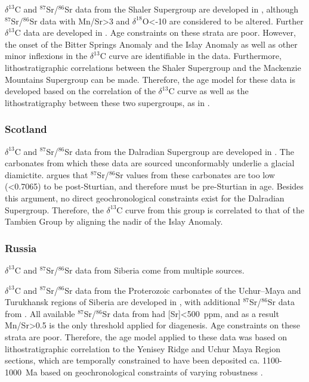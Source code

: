 \documentclass[11pt,letterpaper]{article}
\newcommand{\dC}{$\delta^{13}$C\xspace}
\newcommand{\dO}{$\delta^{18}$O\xspace}
\newcommand{\SrSr}{$^{87}$Sr/$^{86}$Sr\xspace}
\newcommand{\permil}{\textperthousand\xspace}
\begin{document}
\dC and \SrSr data from the Shaler Supergroup are developed in \citet{Asmerom1991a}, although \SrSr data with Mn/Sr\textgreater3 and \dO\textless-10\permil are considered to be altered. Further \dC data are developed in \citet{Jones2010a}. Age constraints on these strata are poor. However, the onset of the Bitter Springs Anomaly and the Islay Anomaly as well as other minor inflexions in the \dC curve are identifiable in the data. Furthermore, lithostratigraphic correlations between the Shaler Supergroup and the Mackenzie Mountains Supergroup can be made. Therefore, the age model for these data is developed based on the correlation of the \dC curve as well as the lithostratigraphy between these two supergroups, as in \citet{Jones2010a}.

\subsubsection*{Scotland}

\dC and \SrSr data from the Dalradian Supergroup are developed in \citet{Sawaki2010a}. The carbonates from which these data are sourced unconformably underlie a glacial diamictite. \citet{Brasier2000a} argues that \SrSr values from these carbonates are too low (\textless0.7065) to be post-Sturtian, and therefore must be pre-Sturtian in age. Besides this argument, no direct geochronological constraints exist for the Dalradian Supergroup. Therefore, the \dC curve from this group is correlated to that of the Tambien Group by aligning the nadir of the Islay Anomaly.

\subsubsection*{Russia}

\dC and \SrSr data from Siberia come from multiple sources.

\dC and \SrSr data from the Proterozoic carbonates of the Uchur–Maya and Turukhansk regions of Siberia are developed in \citet{Bartley2001a}, with additional \SrSr data from \citet{Cox2016a}. All available \SrSr data from \citet{Bartley2001a} had [Sr]\textless500~ppm, and as a result Mn/Sr\textgreater0.5 is the only threshold applied for diagenesis. Age constraints on these strata are poor. Therefore, the age model applied to these data was based on lithostratigraphic correlation to the Yenisey Ridge and Uchur Maya Region sections, which are temporally constrained to have been deposited ca. 1100-1000~Ma based on geochronological constraints of varying robustness \citep{Gallet2012a}.
\end{document}
